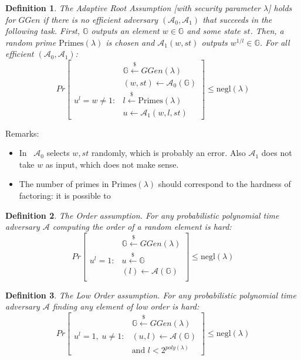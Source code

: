 \documentclass[a4paper]{article}
\newtheorem{definition}{Definition}
\begin{document}
\begin{definition}
The \emph{Adaptive Root Assumption} [with security parameter $\lambda$] holds for
$GGen$ if there is no efficient adversary $(\mathcal{A}_0, \mathcal{A}_1)$ that succeeds in the following task. First,
$\mathbb{G}$ outputs an element $w\in \mathbb{G}$ and some state $st$. Then, a random prime $\mathrm{Primes}(\lambda)$ is chosen
and $\mathcal{A}_1(w,st)$ outputs $w^{1/l}\in\mathbb{G}$. For all efficient $(\mathcal{A}_0, \mathcal{A}_1)$:
$$
Pr
\begin{bmatrix}
&\mathbb{G}\xleftarrow{\$}GGen(\lambda)\\
& (w,st)\xleftarrow{}\mathcal{A}_0(\mathbb{G})\\
u^l = w\neq 1 :& l\xleftarrow{\$}\mathrm{Primes}(\lambda)\\
&u \xleftarrow{} \mathcal{A}_1(w,l,st)
\end{bmatrix}\leq \mathrm{negl}(\lambda)
$$
\end{definition}
Remarks:
\begin{itemize}
    \item In~\cite{cryptoeprint:2019:1229} $\mathcal{A}_0$ selects $w,st$ randomly, which is probably an error. Also $\mathcal{A}_1$ does not take $w$ as input, which does not make sense.
    \item The number of primes in $\mathrm{Primes}(\lambda)$ should correspond to the hardness of factoring: it is possible to 
\end{itemize}
\begin{definition}
The \emph{Order assumption}. For any probabilistic polynomial time adversary $\mathcal{A}$ computing the order of a random element is hard: 
$$
Pr
\begin{bmatrix}
&\mathbb{G}\xleftarrow{\$}GGen(\lambda)\\
u^l = 1 : &u   \xleftarrow{\$}\mathbb{G}\\ 
& (l)  \xleftarrow{} \mathcal{A}(\mathbb{G})\\
\end{bmatrix}\leq \mathrm{negl}(\lambda)
$$

\end{definition}

\begin{definition}
The \emph{Low Order assumption}. For any probabilistic polynomial time adversary $\mathcal{A}$ finding any element of low  order is hard: 
$$
Pr
\begin{bmatrix}
&\mathbb{G}\xleftarrow{\$}GGen(\lambda)\\
u^l = 1,\;u\neq 1 :
& (u,l)  \xleftarrow{} \mathcal{A}(\mathbb{G})\\
& \text{and }l<2^{poly(\lambda)}
\end{bmatrix}\leq \mathrm{negl}(\lambda)
$$

\end{definition}
\end{document}
